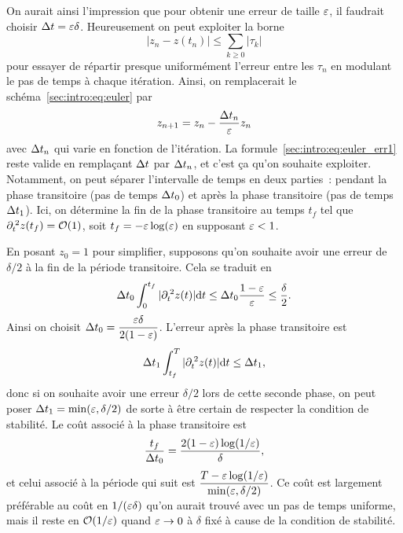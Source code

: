 On aurait ainsi l'impression que pour obtenir une erreur de taille
$\varepsilon$, il faudrait choisir $\Delta t = \varepsilon \delta$. Heureusement on peut
exploiter la borne
\begin{equation*}
    \left| z_n - z(t_n) \right| \leq \sum_{k \geq 0} |\tau_k| 
\end{equation*}
pour essayer de répartir presque uniformément l'erreur entre les
$\tau_n$ en modulant le pas de temps à chaque itération. Ainsi, on
remplacerait le schéma~\eqref{sec:intro:eq:euler} par 
\begin{equation*}
    z_{n+1} = z_n - \frac{\Delta t_n}{\varepsilon} z_n
\end{equation*}
avec $\Delta t_n$ qui varie en fonction de l'itération. La
formule~\eqref{sec:intro:eq:euler_err1} reste valide en remplaçant $\Delta t$
par $\Delta t_n$, et c'est ça qu'on souhaite exploiter. Notamment, on peut
séparer l'intervalle de temps en deux parties~: pendant la phase
transitoire (pas de temps $\Delta t_0$) et après la phase transitoire (pas de
temps $\Delta t_1$). Ici, on détermine la fin de la phase transitoire au
temps $t_f$ tel que $\partial_t^{\:2} z(t_f) = \mathcal{O}(1)$, soit $t_f = -\varepsilon
\log(\varepsilon)$ en supposant $\varepsilon < 1$. 

En posant $z_0 = 1$ pour simplifier, supposons qu'on souhaite avoir une
erreur de $\delta/2$ à la fin de la période transitoire. Cela se traduit
en 
\begin{equation*}
    \Delta t_0 \int_0^{t_f} |\partial_t^{\:2} z(t)| \mathrm{d} t 
    \leq \Delta t_0 \frac{1 - \varepsilon}{\varepsilon} \leq \frac{\delta}{2} .
\end{equation*}
Ainsi on choisit $\displaystyle \Delta t_0 = \frac{\varepsilon \delta}{2(1 -
\varepsilon)}$. L'erreur après la phase transitoire est 
\begin{equation*}
    \Delta t_1 \int_{t_f}^{T} |\partial_t^{\:2} z(t)| \mathrm{d} t 
    \leq \Delta t_1 ,
\end{equation*}
donc si on souhaite avoir une erreur $\delta/2$ lors de cette seconde
phase, on peut poser $\Delta t_1 = \min(\varepsilon, \delta/2)$ de sorte à être
certain de respecter la condition de stabilité. Le coût associé à la
phase transitoire est 
\begin{equation*}
    \frac{t_f}{\Delta t_0} = \frac{2 (1-\varepsilon) \log(1/\varepsilon)}{\delta} ,
\end{equation*}
et celui associé à la période qui suit est $\displaystyle \frac{ T -
\varepsilon \log(1/\varepsilon)}{\min(\varepsilon, \delta/2)}$. Ce coût est largement
préférable au coût en $1/(\varepsilon \delta)$ qu'on aurait trouvé avec un pas
de temps uniforme, mais il reste en $\mathcal{O}(1/\varepsilon)$ quand $\varepsilon
\rightarrow 0$ à $\delta$ fixé à cause de la condition de stabilité.

